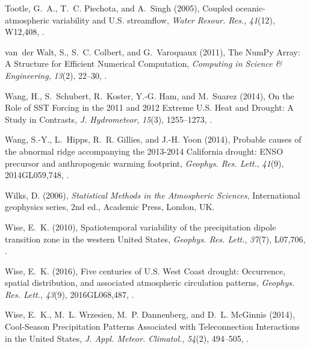 \documentclass[final, double]{ua-thesis}
\begin{document}
\begin{thebibliography}{59}
Tootle, G.~A., T.~C. Piechota, and A.~Singh (2005), Coupled oceanic-atmospheric
  variability and {U}.{S}. streamflow, \textit{Water Resour. Res.},
  \textit{41}(12), W12,408, .

van~der Walt, S., S.~C. Colbert, and G.~Varoquaux (2011), The {NumPy} {Array}:
  {A} {Structure} for {Efficient} {Numerical} {Computation}, \textit{Computing
  in Science \& Engineering}, \textit{13}(2), 22--30,
  .

Wang, H., S.~Schubert, R.~Koster, Y.-G. Ham, and M.~Suarez
  (2014{}), On the {Role} of {SST} {Forcing} in the 2011 and 2012
  {Extreme} {U}.{S}. {Heat} and {Drought}: {A} {Study} in {Contrasts},
  \textit{J. Hydrometeor}, \textit{15}(3), 1255--1273,
  .

Wang, S.-Y., L.~Hipps, R.~R. Gillies, and J.-H. Yoon (2014{}),
  Probable causes of the abnormal ridge accompanying the 2013-2014
  {California} drought: {ENSO} precursor and anthropogenic warming footprint,
  \textit{Geophys. Res. Lett.}, \textit{41}(9), 2014GL059,748,
  .

Wilks, D. (2006), \textit{Statistical {Methods} in the {Atmospheric}
  {Sciences}}, International geophysics series, 2nd ed., Academic Press,
  London, UK.

Wise, E.~K. (2010), Spatiotemporal variability of the precipitation dipole
  transition zone in the western {United} {States}, \textit{Geophys. Res.
  Lett.}, \textit{37}(7), L07,706, .

Wise, E.~K. (2016), Five centuries of {U}.{S}. {West} {Coast} drought:
  {Occurrence}, spatial distribution, and associated atmospheric circulation
  patterns, \textit{Geophys. Res. Lett.}, \textit{43}(9), 2016GL068,487,
  .

Wise, E.~K., M.~L. Wrzesien, M.~P. Dannenberg, and D.~L. McGinnis (2014),
  Cool-{Season} {Precipitation} {Patterns} {Associated} with {Teleconnection}
  {Interactions} in the {United} {States}, \textit{J. Appl. Meteor. Climatol.},
  \textit{54}(2), 494--505, .
  

\end{thebibliography}
\end{document}
